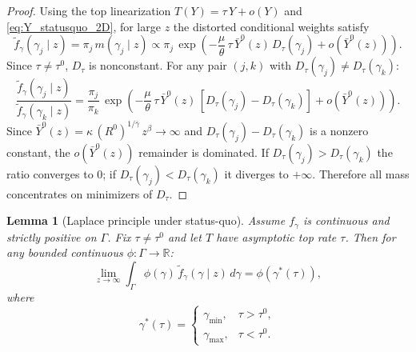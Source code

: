 \documentclass[12pt,a4paper]{article}
\theoremstyle{definition}
\theoremstyle{plain}
\newtheorem{lemma}{Lemma}[section]
\theoremstyle{remark}
\newcommand{\R}{\mathbb{R}}
\begin{document}
\begin{proof}
Using the top linearization $T(Y) = \tau\,Y + o(Y)$ and \eqref{eq:Y_statusquo_2D}, for large $z$ the distorted conditional weights satisfy
\[
  \widetilde{f}_{\gamma}(\gamma_j \mid z) = \pi_j\,m(\gamma_j \mid z) \propto \pi_j\,\exp\!\left(-\frac{\mu}{\theta}\,\tau\,\bar{Y}^0(z)\,D_{\tau}(\gamma_j) + o(\bar{Y}^0(z))\right).
\]
Since $\tau \neq \tau^0$, $D_{\tau}$ is nonconstant.  For any pair $(j,k)$ with $D_{\tau}(\gamma_j) \neq D_{\tau}(\gamma_k)$:
\[
  \frac{\widetilde{f}_{\gamma}(\gamma_j \mid z)}{\widetilde{f}_{\gamma}(\gamma_k \mid z)} = \frac{\pi_j}{\pi_k}\,\exp\!\left(-\frac{\mu}{\theta}\,\tau\,\bar{Y}^0(z)\,[D_{\tau}(\gamma_j) - D_{\tau}(\gamma_k)] + o(\bar{Y}^0(z))\right).
\]
Since $\bar{Y}^0(z) = \kappa\,(R^0)^{1/\bar\gamma}\,z^{\beta} \to \infty$ and $D_{\tau}(\gamma_j) - D_{\tau}(\gamma_k)$ is a nonzero constant, the $o(\bar{Y}^0(z))$ remainder is dominated.  If $D_{\tau}(\gamma_j) > D_{\tau}(\gamma_k)$ the ratio converges to $0$; if $D_{\tau}(\gamma_j) < D_{\tau}(\gamma_k)$ it diverges to $+\infty$.  Therefore all mass concentrates on minimizers of $D_{\tau}$.
\end{proof}

\begin{lemma}[Laplace principle under status-quo]
\label{lem:laplace_statusquo_2D}
Assume $f_{\gamma}$ is continuous and strictly positive on $\Gamma$.  Fix $\tau \neq \tau^0$ and let $T$ have asymptotic top rate $\tau$.  Then for any bounded continuous $\phi: \Gamma \to \R$:
\[
  \lim_{z \to \infty}\int_{\Gamma} \phi(\gamma)\,\widetilde{f}_{\gamma}(\gamma \mid z)\,d\gamma = \phi(\gamma^*(\tau)),
\]
where
\[
  \gamma^*(\tau) = \begin{cases} \gamma_{\min}, & \tau > \tau^0, \\ \gamma_{\max}, & \tau < \tau^0. \end{cases}
\]
\end{lemma}
\end{document}

